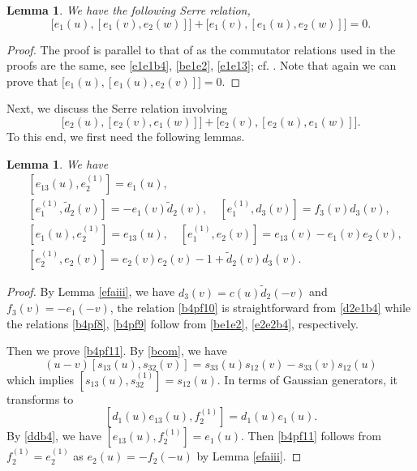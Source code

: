\documentclass[11pt,reqno]{amsart}
\numberwithin{equation}{section}
\newtheorem{lem}[thm]{Lemma}
\theoremstyle{definition}
\theoremstyle{remark}
\newtheorem{rem}[thm]{Remark}
\newcommand{\tl}{\tilde}
\begin{document}
\begin{lem}\label{sec:A-serre}
We have the following Serre relation,
\[
\big[e_1(u),[e_1(v),e_2(w)]\big]+\big[e_1(v),[e_1(u),e_2(w)]\big]=0.
\]
\end{lem}
\begin{proof}
The proof is parallel to that of \cite[Lem. 5.7 (ii)]{BK05} as the commutator relations used in the proofs are the same, see \eqref{e1e1b4}, \eqref{be1e2}, \eqref{e1e13}; cf. \cite[Lem. 5.5]{BK05}. Note that again we can prove that $\big[e_1(u),[e_1(u),e_2(v)]\big]=0$.
\end{proof}


Next, we discuss the Serre relation involving
\[
\big[e_2(u),[e_2(v),e_1(w)]\big]+\big[e_2(v),[e_2(u),e_1(w)]\big].
\]
To this end, we first need the following lemmas. 
\begin{lem}\label{help1}
We have
\begin{align}
&[e_{13}(u),e_2^{(1)}]=e_1(u),\label{b4pf11}\\
&[e_1^{(1)},\tl d_2(v)]=-e_1(v)\tl d_2(v),\quad [e_1^{(1)}, d_3(v)]=f_3(v) d_3(v),\label{b4pf10}\\
&[e_1(u),e_2^{(1)}]=e_{13}(u),\quad [e_1^{(1)},e_2(v)]=e_{13}(v)-e_1(v)e_2(v),\label{b4pf8}\\
&[e_2^{(1)},e_2(v)]=e_2(v)e_2(v)-1+\tl d_2(v)d_3(v).    \label{b4pf9}
\end{align}
\end{lem}
\begin{proof}
By Lemma \ref{efaiii}, we have $d_{3}(v)=c(u)\tl d_{2}(-v)$ and $f_3(v)=-e_1(-v)$, the relation \eqref{b4pf10} is straightforward from \eqref{d2e1b4} while the relations \eqref{b4pf8}, \eqref{b4pf9} follow from \eqref{be1e2}, \eqref{e2e2b4}, respectively. 

Then we prove \eqref{b4pf11}. By \eqref{bcom}, we have
\[
(u-v)[s_{13}(u),s_{32}(v)]=s_{33}(u)s_{12}(v)-s_{33}(v)s_{12}(u)
\]
which implies $[s_{13}(u),s_{32}^{(1)}]=s_{12}(u)$. In terms of Gaussian generators, it transforms to
\[
[d_1(u)e_{13}(u),f_{2}^{(1)}]=d_1(u)e_1(u).
\]
By \eqref{ddb4}, we have $[e_{13}(u),f_{2}^{(1)}]=e_1(u)$. Then \eqref{b4pf11} follows from $f_{2}^{(1)}=e_{2}^{(1)}$ as $e_2(u)=-f_2(-u)$ by Lemma \ref{efaiii}.
\end{proof}
\end{document}
